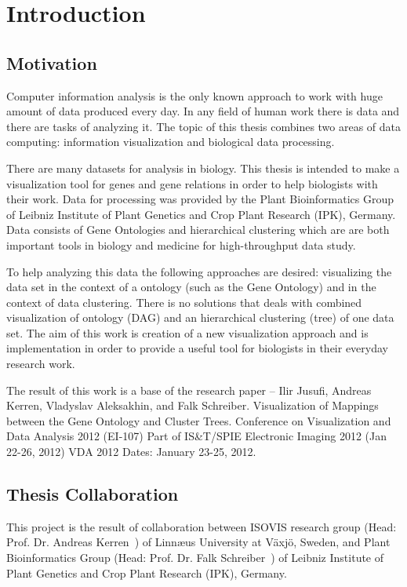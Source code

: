 \section{Introduction}
\label{sec:introduction}

\subsection{Motivation}
\label{sec:motivation}

Computer information analysis is the only known approach to work with huge amount of data produced every day. In any field of human work there is data and there are tasks of analyzing it. The topic of this thesis combines two areas of data computing: information visualization and biological data processing.

There are many datasets for analysis in biology. This thesis is intended to make a visualization tool for genes and gene relations in order to help biologists with their work. Data for processing was provided by the Plant Bioinformatics Group of Leibniz Institute of Plant Genetics and Crop Plant Research (IPK), Germany. Data consists of Gene Ontologies and hierarchical clustering which are are both important tools in biology and medicine for high-throughput data study.

To help analyzing this data the following approaches are desired: visualizing the data set in the context of a ontology (such as the Gene Ontology) and in the context of data clustering. There is no solutions that deals with combined visualization of ontology (DAG) and an hierarchical clustering (tree) of one data set. The aim of this work is creation of a new visualization approach and is implementation in order to provide a useful tool for biologists in their everyday research work.

The result of this work is a base of the research paper -- \textsf{Ilir Jusufi, Andreas Kerren, Vladyslav Aleksakhin, and Falk Schreiber. Visualization of Mappings between the Gene Ontology and Cluster Trees. Conference on Visualization and Data Analysis 2012 (EI-107) Part of IS&T/SPIE Electronic Imaging 2012 (Jan 22-26, 2012) VDA 2012 Dates: January 23-25, 2012.}

\subsection{Thesis Collaboration}
This project is the result of collaboration between ISOVIS research group (Head: Prof. Dr. Andreas Kerren~\cite{Kerren}) of Linn\ae us University at V\"axj\"o, Sweden, and Plant Bioinformatics Group (Head: Prof. Dr. Falk Schreiber~\cite{Schreiber}) of Leibniz Institute of Plant Genetics and Crop Plant Research (IPK), Germany.



